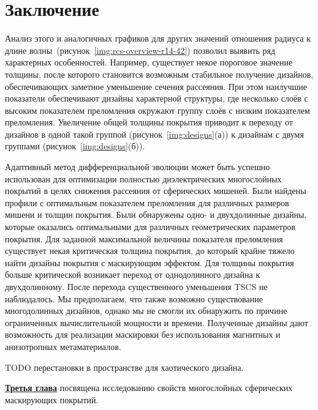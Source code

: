 \section{Заключение}
Анализ этого и аналогичных графиков для других значений отношения
радиуса к длине волны~(рисунок~\ref{img:rcs-overview-r14-42}) позволил
выявить ряд характерных особенностей. Например, существует некое
пороговое значение толщины, после которого становится возможным
стабильное получение дизайнов, обеспечивающих заметное уменьшение
сечения рассеяния. При этом наилучшие показатели обеспечивают дизайны
характерной структуры, где несколько слоёв с высоким показателем
преломления окружают группу слоёв с низким показателем
преломления. Увеличение общей толщины покрытия приводит к переходу от
дизайнов в одной такой группой (рисунок~\ref{img:designs}(а)) к
дизайнам с двумя группами (рисунок~\ref{img:designs}(б)).




Адаптивный метод дифференциальной эволюции может быть успешно
использован для оптимизации полностью диэлектрических многослойных
покрытий в целях снижения рассеяния от сферических мишеней.  Были
найдены профили с оптимальным показателем преломления для различных
размеров мишени и толщин покрытия.  Были обнаружены одно- и
двухдолинные дизайны, которые оказались оптимальными для различных
геометрических параметров покрытия.  Для заданной максимальной
величины показателя преломления существует некая критическая толщина
покрытия, до который крайне тяжело найти дизайны покрытия с
маскирующим эффектом.  Для толщины покрытия больше критической
возникает переход от однодолинного дизайна к двухдолинному.  После
перехода существенного уменьшения TSCS не наблюдалось.  Мы
предполагаем, что также возможно существование многодолинных дизайнов,
однако мы не смогли их обнаружить по причине ограниченных
вычислительной мощности и времени.  Полученные дизайны дают
возможность для реализации маскировки без использования магнитных и
анизотропных метаматериалов.
   


TODO перестановки в пространстве для хаотического дизайна.

\underline{\textbf{Третья глава}} посвящена исследованию свойств
многослойных сферических маскирующих покрытий.


